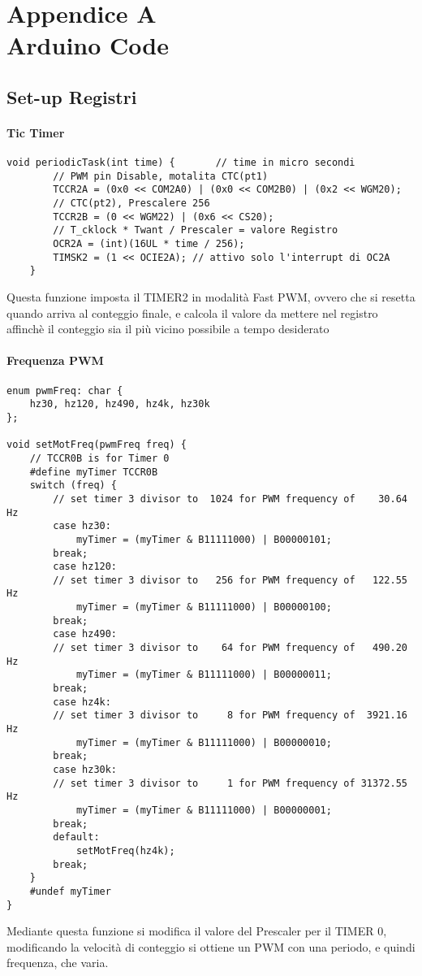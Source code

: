 \chapter*{Appendice A\\ Arduino Code}\label{ArduinoCode}

\section{Set-up Registri}

\subsubsection{Tic Timer}

\begin{lstlisting}[style=cppStyle,caption={Tic Timer},label=lst:ticTimer] 
	void periodicTask(int time) { 		// time in micro secondi
		// PWM pin Disable, motalita CTC(pt1)
		TCCR2A = (0x0 << COM2A0) | (0x0 << COM2B0) | (0x2 << WGM20);
		// CTC(pt2), Prescalere 256
		TCCR2B = (0 << WGM22) | (0x6 << CS20);                       
		// T_cklock * Twant / Prescaler = valore Registro
		OCR2A = (int)(16UL * time / 256);
		TIMSK2 = (1 << OCIE2A); // attivo solo l'interrupt di OC2A
	}
\end{lstlisting}
Questa funzione imposta il TIMER2 in modalità Fast PWM, ovvero che si resetta quando arriva al conteggio finale, e calcola il valore da mettere nel registro affinchè il conteggio sia il più vicino possibile a tempo desiderato

\subsubsection{Frequenza PWM}

\begin{lstlisting}[style=cppStyle,caption={Frequenza PWM},label=lst:pwmFreq] 
enum pwmFreq: char {
	hz30, hz120, hz490, hz4k, hz30k
};

void setMotFreq(pwmFreq freq) {
	// TCCR0B is for Timer 0
	#define myTimer TCCR0B
	switch (freq) {
		// set timer 3 divisor to  1024 for PWM frequency of    30.64 Hz
		case hz30:
			myTimer = (myTimer & B11111000) | B00000101;
		break;
		case hz120:
		// set timer 3 divisor to   256 for PWM frequency of   122.55 Hz
			myTimer = (myTimer & B11111000) | B00000100;
		break;
		case hz490:
		// set timer 3 divisor to    64 for PWM frequency of   490.20 Hz
			myTimer = (myTimer & B11111000) | B00000011;
		break;
		case hz4k:
		// set timer 3 divisor to     8 for PWM frequency of  3921.16 Hz
			myTimer = (myTimer & B11111000) | B00000010;
		break;
		case hz30k:
		// set timer 3 divisor to     1 for PWM frequency of 31372.55 Hz
			myTimer = (myTimer & B11111000) | B00000001;
		break;
		default:
			setMotFreq(hz4k);
		break;
	}
	#undef myTimer
}
\end{lstlisting}
Mediante questa funzione si modifica il valore del Prescaler per il TIMER 0, modificando la velocità di conteggio si ottiene un PWM con una periodo, e quindi frequenza, che varia.

